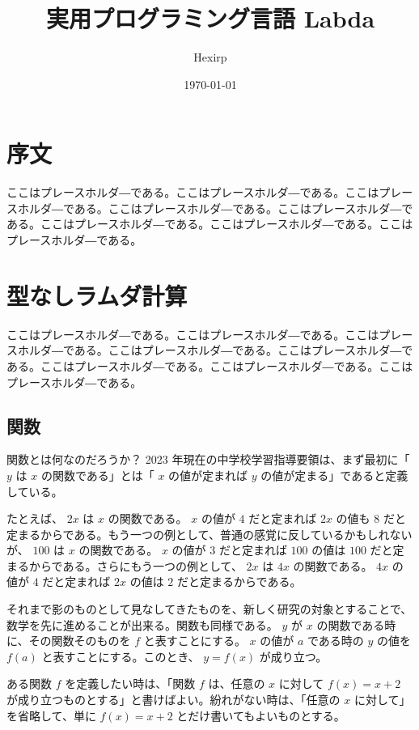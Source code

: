 \documentclass[book]{jlreq}
\title{実用プログラミング言語 Labda}
\author{Hexirp}
\date{\today}
\newcommand{\p}[1]{ \mathord{ \left( #1 \right) } }
\begin{document}
\maketitle

\chapter*{序文}

ここはプレースホルダ―である。ここはプレースホルダ―である。ここはプレースホルダ―である。ここはプレースホルダ―である。ここはプレースホルダ―である。ここはプレースホルダ―である。ここはプレースホルダ―である。ここはプレースホルダ―である。

\chapter{型なしラムダ計算}

ここはプレースホルダ―である。ここはプレースホルダ―である。ここはプレースホルダ―である。ここはプレースホルダ―である。ここはプレースホルダ―である。ここはプレースホルダ―である。ここはプレースホルダ―である。ここはプレースホルダ―である。

\section{関数}

関数とは何なのだろうか？ 2023 年現在の中学校学習指導要領は、まず最初に「 \( y \) は \( x \) の関数である」とは「 \( x \) の値が定まれば \( y \) の値が定まる」であると定義している。

たとえば、 \( 2 x \) は \( x \) の関数である。 \( x \) の値が \( 4 \) だと定まれば \( 2 x \) の値も \( 8 \) だと定まるからである。もう一つの例として、普通の感覚に反しているかもしれないが、 \( 100 \) は \( x \) の関数である。 \( x \) の値が \( 3 \) だと定まれば \( 100 \) の値は \( 100 \) だと定まるからである。さらにもう一つの例として、 \( 2 x \) は \( 4 x \) の関数である。 \( 4 x \) の値が \( 4 \) だと定まれば \( 2 x \) の値は \( 2 \) だと定まるからである。

それまで影のものとして見なしてきたものを、新しく研究の対象とすることで、数学を先に進めることが出来る。関数も同様である。 \( y \) が \( x \) の関数である時に、その関数そのものを \( f \) と表すことにする。 \( x \) の値が \( a \) である時の \( y \) の値を \( f \p{ a } \) と表すことにする。このとき、 \( y = f \p{ x } \) が成り立つ。

ある関数 \( f \) を定義したい時は、「関数 \( f \) は、任意の \( x \) に対して \( f \p{ x } = x + 2 \) が成り立つものとする」と書けばよい。紛れがない時は、「任意の \( x \) に対して」を省略して、単に \( f \p{ x } = x + 2 \) とだけ書いてもよいものとする。
\end{document}
